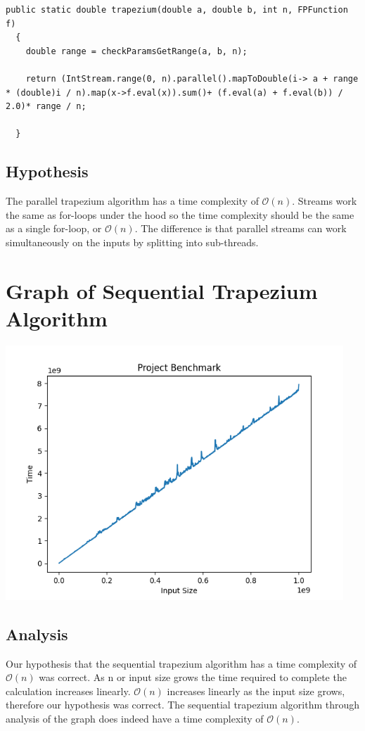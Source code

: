 \documentclass[12pt]{article}
\begin{document}
\begin{verbatim} 
public static double trapezium(double a, double b, int n, FPFunction f)
  {
    double range = checkParamsGetRange(a, b, n);

    return (IntStream.range(0, n).parallel().mapToDouble(i-> a + range * (double)i / n).map(x->f.eval(x)).sum()+ (f.eval(a) + f.eval(b)) / 2.0)* range / n;

  }
\end{verbatim}

\subsection{Hypothesis}
The parallel trapezium algorithm has a time complexity of $\mathcal{O}(n)$. Streams work the same as for-loops under the hood so the time complexity should be the same as a single for-loop, or $\mathcal{O}(n)$. The difference is that parallel streams can work simultaneously on the inputs by splitting into sub-threads. 

\section{Graph of Sequential Trapezium Algorithm}

\begin{center}
\includegraphics[width = 5in]{SequentialPlot.PNG}
\end{center}

\subsection{Analysis}
Our hypothesis that the sequential trapezium algorithm has a time complexity of $ \mathcal{O}(n)$ was correct. As n or input size grows the time required to complete the calculation increases linearly.  $ \mathcal{O}(n)$ increases linearly as the input size grows, therefore our hypothesis was correct. The sequential trapezium algorithm through analysis of the graph does indeed have a time complexity of $ \mathcal{O}(n)$.
\end{document}
